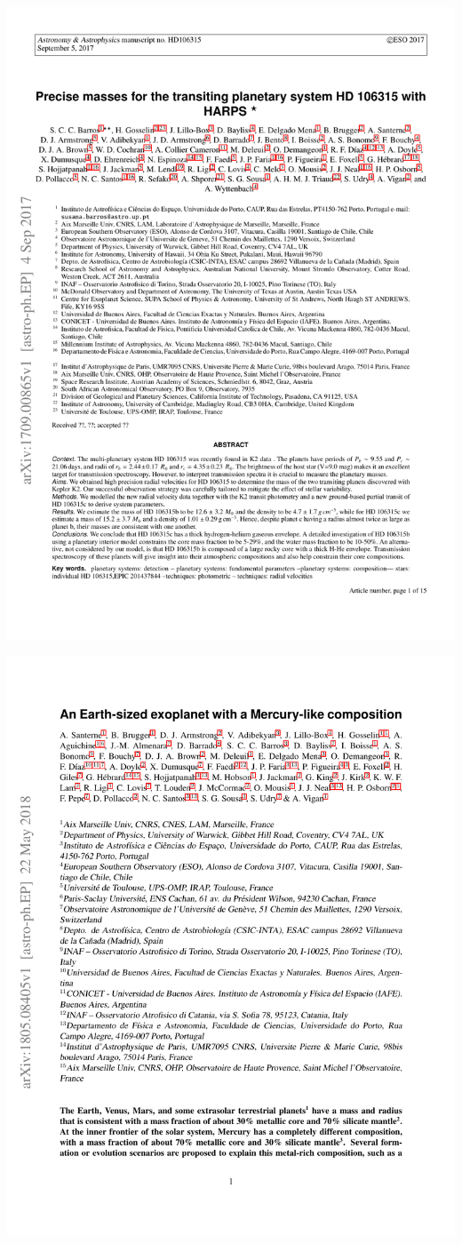 { 
 {\includegraphics[width=.9\textwidth,keepaspectratio=true,page = 1, trim = 1.3cm 1cm 1.3cm 1cm, clip = true]{appendices/papers/Barros2017.pdf}}
 
 
 {\includegraphics[width=.9\textwidth,keepaspectratio=true,page = 1, trim = 1.3cm 1cm 1.3cm 1cm, clip = true]{appendices/papers/Santerne2018.pdf}}
 
}
